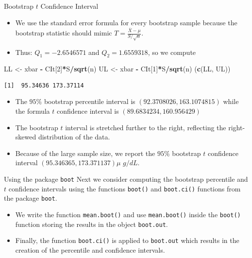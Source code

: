 \documentclass[
  ignorenonframetext,
]{beamer}
\newenvironment{Shaded}{\begin{snugshade}}{\end{snugshade}}
\newcommand{\DecValTok}[1]{\textcolor[rgb]{0.00,0.00,0.81}{#1}}
\newcommand{\FunctionTok}[1]{\textcolor[rgb]{0.13,0.29,0.53}{\textbf{#1}}}
\newcommand{\NormalTok}[1]{#1}
\newcommand{\OtherTok}[1]{\textcolor[rgb]{0.56,0.35,0.01}{#1}}
\newcommand{\SpecialCharTok}[1]{\textcolor[rgb]{0.81,0.36,0.00}{\textbf{#1}}}
\begin{document}
\begin{frame}[fragile]{Bootstrap \(t\) Confidence Interval}
\protect\hypertarget{bootstrap-t-confidence-interval-10}{}
\begin{itemize}
\item
  We use the standard error formula for every bootstrap sample because
  the bootstrap statistic should mimic
  \(T=\frac{\bar{X}-\mu}{S/\sqrt{n}}\).
\item
  Thus: \(Q_1=-2.6546571\) and \(Q_2=1.6559318\), so we compute
\end{itemize}

\small

\begin{Shaded}
\begin{Highlighting}[]
\NormalTok{LL }\OtherTok{\textless{}{-}}\NormalTok{ xbar }\SpecialCharTok{{-}}\NormalTok{ CIt[}\DecValTok{2}\NormalTok{]}\SpecialCharTok{*}\NormalTok{S}\SpecialCharTok{/}\FunctionTok{sqrt}\NormalTok{(n)}
\NormalTok{UL }\OtherTok{\textless{}{-}}\NormalTok{ xbar }\SpecialCharTok{{-}}\NormalTok{ CIt[}\DecValTok{1}\NormalTok{]}\SpecialCharTok{*}\NormalTok{S}\SpecialCharTok{/}\FunctionTok{sqrt}\NormalTok{(n)}
\NormalTok{(}\FunctionTok{c}\NormalTok{(LL, UL))}
\end{Highlighting}
\end{Shaded}

\begin{verbatim}
[1]  95.34636 173.37114
\end{verbatim}

\normalsize

\begin{itemize}
\item
  The \(95\%\) bootstrap percentile interval is
  \((92.3708026, 163.1074815)\) while the formula \(t\) confidence
  interval is \((89.6834234, 160.956429)\)
\item
  The bootstrap \(t\) interval is stretched further to the right,
  reflecting the right-skewed distribution of the data.
\item
  Because of the large sample size, we report the \(95\%\) bootstrap
  \(t\) confidence interval \((95.346365, 173.371137)\mu\) \(g/dL\).
\end{itemize}
\end{frame}

\begin{frame}[fragile]{Using the package \texttt{boot}}
\protect\hypertarget{using-the-package-boot}{}
Next we consider computing the bootstrap percentile and \(t\) confidence
intervals using the functions \texttt{boot()} and \texttt{boot.ci()}
functions from the package \texttt{boot}.

\begin{itemize}
\item
  We write the function \texttt{mean.boot()} and use
  \texttt{mean.boot()} inside the \texttt{boot()} function storing the
  results in the object \texttt{boot.out}.
\item
  Finally, the function \texttt{boot.ci()} is applied to
  \texttt{boot.out} which results in the creation of the percentile and
  confidence intervals.
\end{itemize}
\end{frame}
\end{document}
